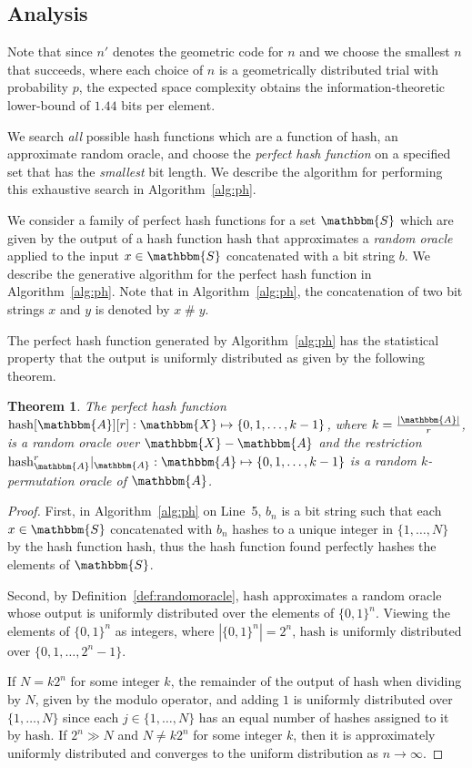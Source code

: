 \documentclass[hidelinks,11pt,final]{article}
\newcommand{\envnumstyle}{section}
\theoremstyle{plain}
\newtheorem{theorem}{Theorem}[\envnumstyle]
\newcommand{\cat}{\mathbin{\#}}
\begin{document}
\subsection{Analysis}
Note that since $n'$ denotes the geometric code for $n$ and we choose the smallest $n$ that succeeds, where each choice of $n$ is a geometrically distributed trial with probability $p$, the expected space complexity obtains the information-theoretic lower-bound of $1.44$ bits per element.


We search \emph{all} possible hash functions which are a function of $\mathrm{hash}$, an approximate random oracle, and choose the \emph{perfect hash function} on a specified set that has the \emph{smallest} bit length. We describe the algorithm for performing this exhaustive search in Algorithm~\ref{alg:ph}.


We consider a family of perfect hash functions for a set $\mathbbm{S}$ which are given by the output of a hash function $\mathrm{hash}$ that approximates a \emph{random oracle} applied to the input $x \in \mathbbm{S}$ concatenated with a bit string $b$. We describe the generative algorithm for the perfect hash function in Algorithm~\ref{alg:ph}. Note that in Algorithm~\ref{alg:ph}, the concatenation of two bit strings $x$ and $y$ is denoted by $x \cat y$.

The perfect hash function generated by Algorithm~\ref{alg:ph} has the statistical property that the output is uniformly distributed as given by the following theorem.
\begin{theorem}
The perfect hash function $\mathrm{hash}[\mathbbm{A}][r] : \mathbbm{X} \mapsto \{0,1,\ldots,k-1\}$, where $k = \frac{|\mathbbm{A}|}{r}$, is a random oracle over $\mathbbm{X} - \mathbbm{A}$ and the restriction $\mathrm{hash}_\mathbbm{A}^r| _{\mathbbm{A}} : \mathbbm{A} \mapsto \{0,1,\ldots,k-1\}$ is a random $k$-permutation oracle of $\mathbbm{A}$.
\end{theorem}
\begin{proof}
First, in Algorithm~\ref{alg:ph} on Line~5, $b_n$ is a bit string such that each $x \in \mathbbm{S}$ concatenated with $b_n$ hashes to a unique integer in $\{1,\ldots,N\}$ by the hash function $\mathrm{hash}$, thus the hash function found perfectly hashes the elements of $\mathbbm{S}$. 

Second, by Definition~\ref{def:randomoracle}, $\mathrm{hash}$ approximates a random oracle whose output is uniformly distributed over the elements of $\{0,1\}^{n}$. Viewing the elements of $\{0,1\}^{n}$ as integers, where $|\{0,1\}^n| = 2^n$, $\mathrm{hash}$ is uniformly distributed over $\{0,1,\ldots,2^n-1\}$.

If $N = k 2^n$ for some integer $k$, the remainder of the output of $\mathrm{hash}$ when dividing by $N$, given by the modulo operator, and adding $1$ is uniformly distributed over $\{1,\ldots,N\}$ since each $j \in \{1,\ldots,N\}$ has an equal number of hashes assigned to it by $\mathrm{hash}$. If $2^n \gg N$ and $N \neq k 2^n$ for some integer $k$, then it is approximately uniformly distributed and converges to the uniform distribution as $n \to \infty$.
\end{proof}
\end{document}
